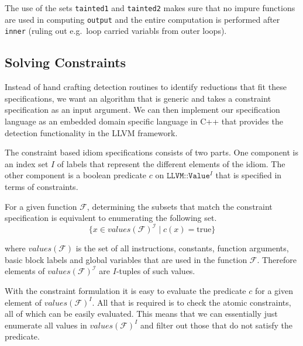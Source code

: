     The use of the sets \texttt{tainted1} and \texttt{tainted2} makes sure that
    no impure functions are used in computing \texttt{output} and the entire
    computation is performed after \texttt{inner} (ruling out e.g.\ loop carried
    variabls from outer loops).


\newpage

\subsection{Solving Constraints}
Instead of hand crafting detection routines to identify reductions 
 that fit these specifications, we want an algorithm
that is generic and takes a constraint specification as an input
argument.  We can then implement our specification language as an
embedded domain specific language in C++ that provides the detection
functionality in the LLVM framework. %

The constraint based idiom specifications 
consists of two parts.  One component is an index set
$I$ of labels that represent the different elements of the idiom.  The
other component is a boolean predicate $c$ on $\texttt{LLVM::Value}^I$
that is specified in terms of constraints.


For a given function $\mathcal F$,  determining the subsets that match the constraint specification
is  equivalent to enumerating the following set.
\begin{equation*}
\{x\in values(\mathcal F)^\mathcal I\mid c(x)=\text{true}\}
\end{equation*}

where $values(\mathcal F)$ is the set of all instructions,
constants, function arguments, basic block labels and global variables
that are used in the function $\mathcal F$.  Therefore elements of
$values(\mathcal F)^\mathcal I$ are $I$-tuples of such values.

With the constraint formulation it is easy to evaluate the predicate $c$ for a given element of $values(\mathcal F)^I$.
All that is required is to check the atomic constraints, all of which can be 
easily evaluated.
This means that we can essentially just enumerate all values in $values(\mathcal F)^I$ and filter out those that do not satisfy the predicate.

